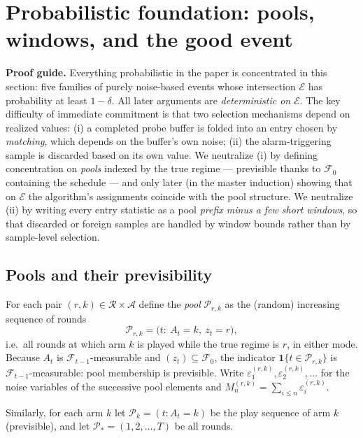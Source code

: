 \documentclass[11pt]{article}
\newcommand{\Acal}{\mathcal A}
\newcommand{\Fcal}{\mathcal F}
\newcommand{\Ecal}{\mathcal E}
\newcommand{\Pcal}{\mathcal P}
\newcommand{\Rcal}{\mathcal R}
\newcommand{\one}{\mathbf 1}
\newcommand{\proofguide}[1]{\par\smallskip\noindent\textcolor{blue!65!black}{\textbf{Proof guide.} #1}\par\smallskip}
\begin{document}
\section{Probabilistic foundation: pools, windows, and the good event}
\label{sec:events}

\proofguide{Everything probabilistic in the paper is concentrated in this section: five families of purely noise-based events whose intersection $\Ecal$ has probability at least $1-\delta$. All later arguments are \emph{deterministic on $\Ecal$}. The key difficulty of immediate commitment is that two selection mechanisms depend on realized values: (i) a completed probe buffer is folded into an entry chosen by \emph{matching}, which depends on the buffer's own noise; (ii) the alarm-triggering sample is discarded based on its own value. We neutralize (i) by defining concentration on \emph{pools} indexed by the true regime --- previsible thanks to $\Fcal_0$ containing the schedule --- and only later (in the master induction) showing that on $\Ecal$ the algorithm's assignments coincide with the pool structure. We neutralize (ii) by writing every entry statistic as a pool \emph{prefix minus a few short windows}, so that discarded or foreign samples are handled by window bounds rather than by sample-level selection.}

\subsection{Pools and their previsibility}

For each pair $(r,k)\in\Rcal\times\Acal$ define the \emph{pool} $\Pcal_{r,k}$ as the (random) increasing sequence of rounds
\begin{equation}
    \Pcal_{r,k}
    =\bigl(t:\ A_t=k,\ z_t=r\bigr),
\end{equation}
i.e.\ all rounds at which arm $k$ is played while the true regime is $r$, in either mode. Because $A_t$ is $\Fcal_{t-1}$-measurable and $(z_t)\subseteq\Fcal_0$, the indicator $\one\{t\in\Pcal_{r,k}\}$ is $\Fcal_{t-1}$-measurable: pool membership is previsible. Write $\varepsilon^{(r,k)}_1,\varepsilon^{(r,k)}_2,\ldots$ for the noise variables of the successive pool elements and $M^{(r,k)}_n=\sum_{i\le n}\varepsilon^{(r,k)}_i$.

Similarly, for each arm $k$ let $\Pcal_k=(t:A_t=k)$ be the play sequence of arm $k$ (previsible), and let $\Pcal_\ast=(1,2,\ldots,T)$ be all rounds.
\end{document}
